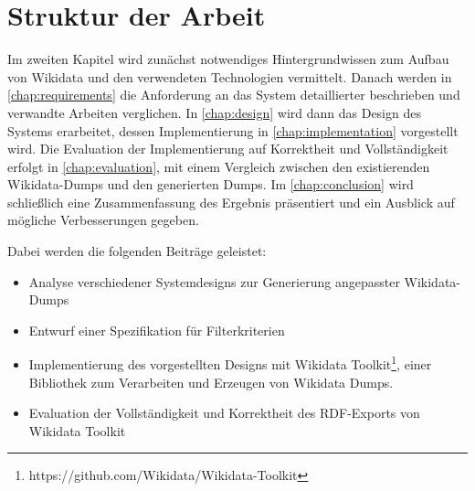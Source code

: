 \section{Struktur der Arbeit}
Im zweiten Kapitel wird zunächst notwendiges Hintergrundwissen zum Aufbau von Wikidata und den verwendeten Technologien vermittelt.
Danach werden in \cref{chap:requirements} die Anforderung an das System detaillierter beschrieben und verwandte Arbeiten verglichen.
In \cref{chap:design} wird dann das Design des Systems erarbeitet, dessen Implementierung in \cref{chap:implementation} vorgestellt wird.
Die Evaluation der Implementierung auf Korrektheit und Vollständigkeit erfolgt in \cref{chap:evaluation}, mit einem  Vergleich zwischen den existierenden Wikidata-Dumps und den generierten Dumps.
Im \cref{chap:conclusion} wird schließlich eine Zusammenfassung des Ergebnis präsentiert und ein Ausblick auf mögliche Verbesserungen gegeben.

Dabei werden die folgenden Beiträge geleistet:
\begin{itemize}
  \item Analyse verschiedener Systemdesigns zur Generierung angepasster Wikidata-Dumps
  \item Entwurf einer Spezifikation für Filterkriterien
  \item Implementierung des vorgestellten Designs mit Wikidata Toolkit\footnote{https://github.com/Wikidata/Wikidata-Toolkit}, einer Bibliothek zum Verarbeiten und Erzeugen von Wikidata Dumps.
  \item Evaluation der Vollständigkeit und Korrektheit des RDF-Exports von Wikidata Toolkit
\end{itemize}